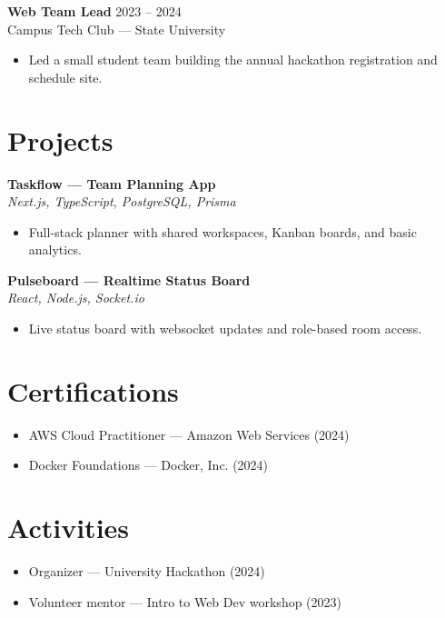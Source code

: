\documentclass[10.5pt, a4paper]{article}
\begin{document}
\textbf{Web Team Lead} \hfill 2023 -- 2024 \\
Campus Tech Club --- State University \\
\begin{itemize}
    \item Led a small student team building the annual hackathon registration and schedule site.
\end{itemize}

\section*{Projects}
\textbf{Taskflow --- Team Planning App} \\
\textit{Next.js, TypeScript, PostgreSQL, Prisma} \\
\begin{itemize}
    \item Full-stack planner with shared workspaces, Kanban boards, and basic analytics.
\end{itemize}

\textbf{Pulseboard --- Realtime Status Board} \\
\textit{React, Node.js, Socket.io} \\
\begin{itemize}
    \item Live status board with websocket updates and role-based room access.
\end{itemize}

\section*{Certifications}
\begin{itemize}
    \item AWS Cloud Practitioner --- Amazon Web Services (2024)
    \item Docker Foundations --- Docker, Inc. (2024)
\end{itemize}

\section*{Activities}
\begin{itemize}
    \item Organizer --- University Hackathon (2024)
    \item Volunteer mentor --- Intro to Web Dev workshop (2023)
\end{itemize}
\end{document}
